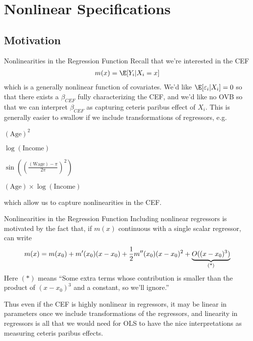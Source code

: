 \documentclass[aspectratio=169, handout]{beamer}
\begin{document}
\section{Nonlinear Specifications}

\subsection{Motivation}


{\scriptsize
\begin{frame}{Nonlinearities in the Regression Function}
Recall that we're interested in the CEF
\begin{align*}
  m(x) = \E[Y_i|X_i=x]
\end{align*}
which is a generally nonlinear function of covariates.
We'd like $\E[\varepsilon_i|X_i]=0$ so that there exists a $\beta_{CEF}$
fully characterizing the CEF, and we'd like no OVB so that we can
interpret $\beta_{CEF}$ as capturing ceteris paribus effect of $X_i$.
This is generally easier to swallow if we include transformations of
regressors, e.g.
\begin{itemize}
  {\scriptsize 
  \item $(\text{Age})^2$
  \item $\log(\text{Income})$
  \item $\sin\left(\left(\frac{(\text{Wage})-\pi}{2\pi}\right)^2\right)$
  \item $(\text{Age})\times\log(\text{Income})$
  }
\end{itemize}
which allow us to capture nonlinearities in the CEF.
\end{frame}
}

{\footnotesize
\begin{frame}{Nonlinearities in the Regression Function}
Including nonlinear regressors is motivated by the fact that, if $m(x)$
continuous with a single scalar regressor, can write
\begin{align*}
  m(x)
  =
  m(x_0)
  + m'(x_0)(x-x_0)
  + \frac{1}{2}m''(x_0)(x-x_0)^2
  +
  \underbrace{%
    O((x-x_0)^3)
  }_{\text{(*)}}
\end{align*}
Here $(*)$ means
``Some extra terms whose contribution is smaller than the product of
$(x-x_0)^3$ and a constant, so we'll ignore.''

Thus even if the CEF is highly nonlinear in \alert{regressors}, it may
be linear in \alert{parameters} once we include transformations of the
regressors, and linearity in regressors is all that we would need for
OLS to have the nice interpretations as measuring ceteris paribus
effects.
\end{frame}
}
\end{document}
